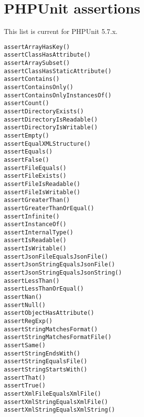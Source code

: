 \documentclass[a4paper,10pt,headsepline]{scrartcl}
\begin{document}
\pagebreak
\section{PHPUnit assertions}
This list is current for PHPUnit 5.7.x.

\begin{verbatim}
assertArrayHasKey()
assertClassHasAttribute()
assertArraySubset()
assertClassHasStaticAttribute()
assertContains()
assertContainsOnly()
assertContainsOnlyInstancesOf()
assertCount()
assertDirectoryExists()
assertDirectoryIsReadable()
assertDirectoryIsWritable()
assertEmpty()
assertEqualXMLStructure()
assertEquals()
assertFalse()
assertFileEquals()
assertFileExists()
assertFileIsReadable()
assertFileIsWritable()
assertGreaterThan()
assertGreaterThanOrEqual()
assertInfinite()
assertInstanceOf()
assertInternalType()
assertIsReadable()
assertIsWritable()
assertJsonFileEqualsJsonFile()
assertJsonStringEqualsJsonFile()
assertJsonStringEqualsJsonString()
assertLessThan()
assertLessThanOrEqual()
assertNan()
assertNull()
assertObjectHasAttribute()
assertRegExp()
assertStringMatchesFormat()
assertStringMatchesFormatFile()
assertSame()
assertStringEndsWith()
assertStringEqualsFile()
assertStringStartsWith()
assertThat()
assertTrue()
assertXmlFileEqualsXmlFile()
assertXmlStringEqualsXmlFile()
assertXmlStringEqualsXmlString()
\end{verbatim}
\end{document}
